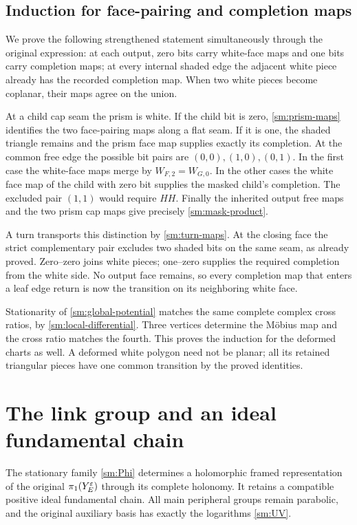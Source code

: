 \subsection{Induction for face-pairing and completion maps}
We prove the following strengthened statement simultaneously through
the original expression: at each output, zero bits carry white-face
maps and one bits carry completion maps; at every internal shaded edge
the adjacent white piece already has the recorded completion
map. When two white pieces become coplanar, their maps agree on the union.

At a child cap seam the prism is white. If the child bit is zero,
\eqref{sm:prism-maps} identifies the two face-pairing maps along a flat seam.
If it is one, the shaded triangle remains and the prism face map
supplies exactly its completion. At the common free edge the
possible bit pairs are $(0,0),(1,0),(0,1)$. In the first case the
white-face maps merge by $W_{F,2}=W_{G,0}$. In the other cases
the white face map of the child with zero bit supplies the masked child's
completion. The excluded pair $(1,1)$ would require $HH$.
Finally the inherited output free maps and the two prism
cap maps give precisely \eqref{sm:mask-product}.

A turn transports this distinction by \eqref{sm:turn-maps}. At the
closing face the strict complementary pair excludes two shaded bits
on the same seam, as already proved. Zero--zero joins white
pieces; one--zero supplies the required completion from the white
side. No output face remains, so every completion map
that enters a leaf edge return is now the transition on its neighboring
white face.

Stationarity of \eqref{sm:global-potential} matches the same complete
complex cross ratios, by \eqref{sm:local-differential}. Three vertices
determine the Möbius map and the cross ratio matches the fourth.
This proves the induction for the deformed charts as well. A deformed
white polygon need not be planar; all its retained triangular pieces
have one common transition by the proved identities.

\section{The link group and an ideal fundamental chain}
\label{sm:group}

\begin{proposition}\label{sm:marked-deformation}
The stationary family \eqref{sm:Phi} determines a holomorphic framed
representation of the original $\pi_1(Y_E^\varepsilon)$ through its complete
holonomy. It retains a compatible positive ideal fundamental chain.
All main peripheral groups remain parabolic, and the original
auxiliary basis has exactly the logarithms \eqref{sm:UV}.
\end{proposition}

